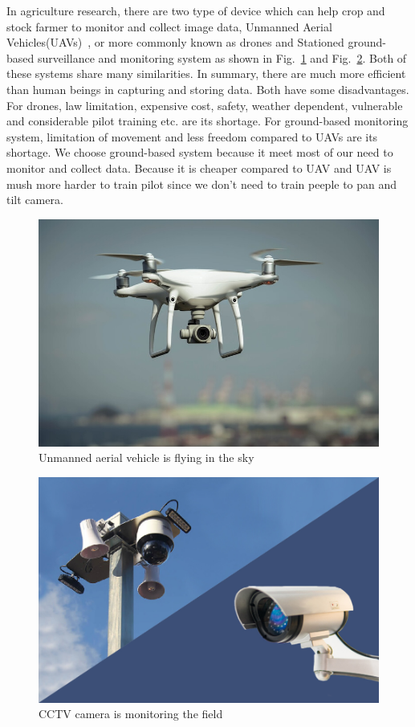 In agriculture research, there are two type of device which can help crop and stock farmer to monitor and collect image data, Unmanned Aerial Vehicles(UAVs)~\cite{uav-wiki}, or more commonly known as drones and Stationed ground-based surveillance and monitoring system as shown in Fig.~\ref{fig:uav} and Fig.~\ref{fig:cctv_camera}. Both of these systems share many similarities. In summary, there are much more efficient than human beings in capturing and storing data. Both have some disadvantages. For drones, law limitation, expensive cost, safety, weather dependent, vulnerable and considerable pilot training etc. are its shortage. For ground-based monitoring system, limitation of movement and less freedom compared to UAVs are its shortage. We choose ground-based system because it meet most of our need to monitor and collect data. Because it is cheaper compared to UAV and UAV is mush more harder to train pilot since we don't need to train peeple to pan and tilt camera.

\begin{figure}[H]
    \centering
    \includegraphics[width=\textwidth]{figsrc/uav.jpeg}
    \caption{Unmanned aerial vehicle is flying in the sky\label{fig:uav}}
\end{figure}


\begin{figure}[H]
    \centering
    \includegraphics[width=\textwidth]{figsrc/cctv_camera.jpeg}
    \caption{CCTV camera is monitoring the field\label{fig:cctv_camera}}
\end{figure}

